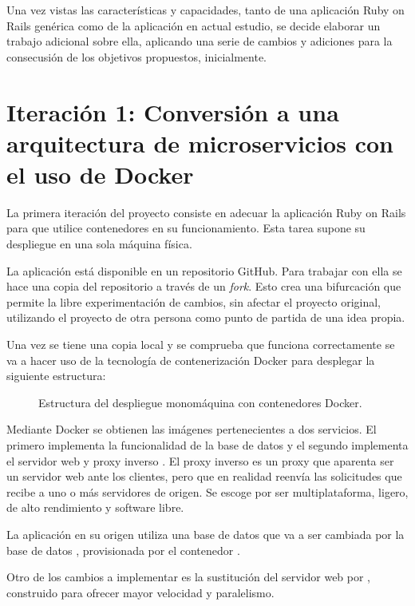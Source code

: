 Una vez vistas las características y capacidades, tanto de una aplicación Ruby on Rails genérica como de la aplicación en actual estudio, se decide elaborar un trabajo adicional sobre ella, aplicando una serie de cambios y adiciones para la consecusión de los objetivos propuestos, inicialmente.

\section{Iteración 1: Conversión a una arquitectura de microservicios con el uso de Docker}

La primera iteración del proyecto consiste en adecuar la aplicación Ruby on Rails para que utilice contenedores en su funcionamiento. Esta tarea supone su despliegue en una sola máquina física.

La aplicación  está disponible en un repositorio GitHub. Para trabajar con ella se hace una copia del repositorio a través de un \textit{fork}. Esto crea una bifurcación que permite la libre experimentación de cambios, sin afectar el proyecto original, utilizando el proyecto de otra persona como punto de partida de una idea propia.

Una vez se tiene una copia local y se comprueba que funciona correctamente se va a hacer uso de la tecnología de contenerización Docker para desplegar la siguiente estructura:

\begin{figure}[H]
\caption{Estructura del despliegue monomáquina con contenedores Docker.\label{fig:figure_docker_microservices}}
\end{figure}

Mediante Docker se obtienen las imágenes pertenecientes a dos servicios. El primero implementa la funcionalidad de la base de datos  y el segundo implementa el servidor web y proxy inverso . El proxy inverso es un proxy que aparenta ser un servidor web ante los clientes, pero que en realidad reenvía las solicitudes que recibe a uno o más servidores de origen. Se escoge  por ser multiplataforma, ligero, de alto rendimiento y software libre.

La aplicación en su origen utiliza una base de datos  que va a ser cambiada por la base de datos , provisionada por el contenedor . 

Otro de los cambios a implementar es la sustitución del servidor web  por , construido para ofrecer mayor velocidad y paralelismo.


